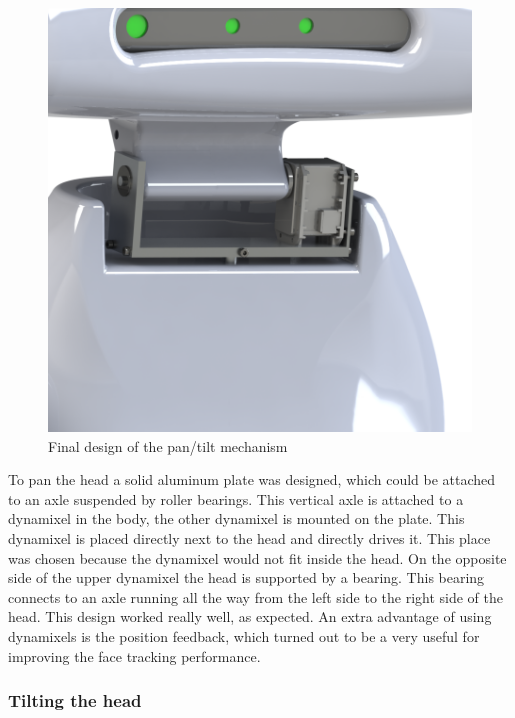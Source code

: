 \documentclass[technical_document.tex]{subfiles}
\begin{document}
\begin{figure}[ht!]
	\centering
	\mbox{\includegraphics[scale=0.8]{Images/neck.png}}
	\caption{Final design of the pan/tilt mechanism}
	\label{fig:neck_final}
\end{figure}

To pan the head a solid aluminum plate was designed, which could be attached to an axle suspended by roller bearings. This vertical axle is attached to a dynamixel in the body, the other dynamixel is mounted on the plate. This dynamixel is placed directly next to the head and directly drives it.
This place was chosen because the dynamixel would not fit inside the head. On the opposite side of the upper dynamixel the head is supported by a bearing. This bearing connects to an axle running all the way from the left side to the right side of the head. This design worked really well, as expected. An extra advantage of using dynamixels is the position feedback, which turned out to be a very useful for improving the face tracking performance. %
 

\subsubsection{Tilting the head}
\label{subsection:tiltHead}
\end{document}
